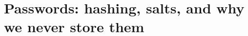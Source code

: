 \chapter{Passwords: hashing, salts, and why we never store them}
\label{ch:passwords-hashing-salts-and-why-we}

